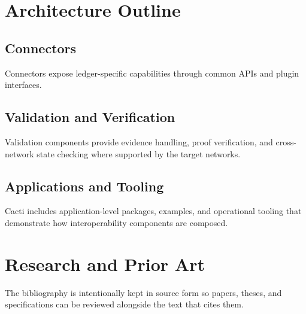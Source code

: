 \documentclass[11pt,letterpaper]{article}
\begin{document}
\section{Architecture Outline}

\subsection{Connectors}

Connectors expose ledger-specific capabilities through common APIs and plugin
interfaces.

\subsection{Validation and Verification}

Validation components provide evidence handling, proof verification, and
cross-network state checking where supported by the target networks.

\subsection{Applications and Tooling}

Cacti includes application-level packages, examples, and operational tooling
that demonstrate how interoperability components are composed.

\section{Research and Prior Art}

The bibliography is intentionally kept in source form so papers, theses, and
specifications can be reviewed alongside the text that cites them.

\nocite{hyperledger-cacti-docs}
\nocite{hyperledger-cacti-repo}



\end{document}
